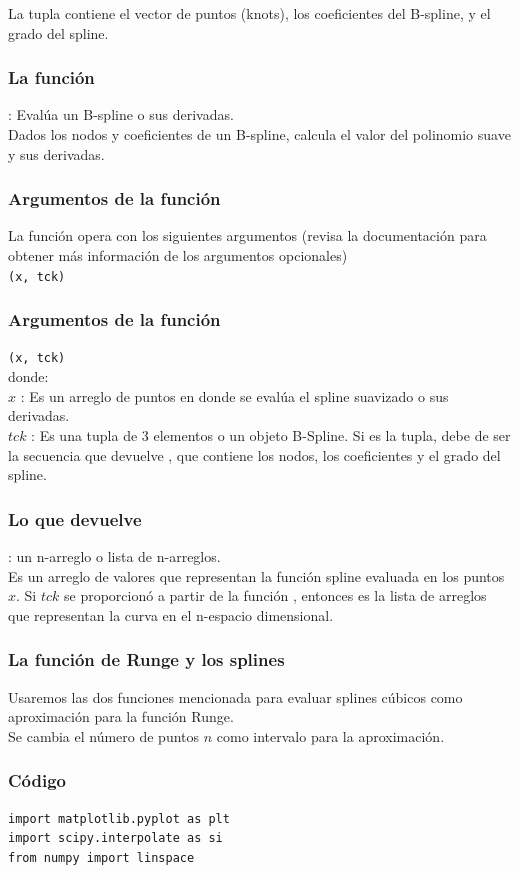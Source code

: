 {\begin{frame}
\bigskip
La tupla  contiene el vector de puntos (knots), los coeficientes del B-spline, y el grado del spline.
\end{frame}
\begin{frame}
\frametitle{La función }
: Evalúa un B-spline o sus derivadas.
\\
\bigskip
Dados los nodos y coeficientes de un B-spline, calcula el valor del polinomio suave y sus derivadas.
\end{frame}
\begin{frame}
\frametitle{Argumentos de la función}
La función opera con los siguientes argumentos (revisa la documentación para obtener más información de los argumentos opcionales)
\\
\bigskip
{} \texttt{(x, tck)}
\end{frame}
\begin{frame}
\frametitle{Argumentos de la función}
 \texttt{(x, tck)}
\\
\bigskip
donde:
\\
\medskip
$x$ : Es un arreglo de puntos en donde se evalúa el spline suavizado o sus derivadas.
\\
\medskip
$tck$ : Es una tupla de 3 elementos o un objeto B-Spline. Si es la tupla, debe de ser la secuencia que devuelve , que contiene los nodos, los coeficientes y el grado del spline.
\end{frame}
\begin{frame}
\frametitle{Lo que devuelve }
 : un n-arreglo o lista de n-arreglos.
\\
\bigskip
Es un arreglo de valores que representan la función spline evaluada en los puntos $x$. Si $tck$ se proporcionó a partir de la función , entonces es la lista de arreglos que representan la curva en el n-espacio dimensional.
\end{frame}
\begin{frame}
\frametitle{La función de Runge y los splines}
Usaremos las dos funciones mencionada para evaluar splines cúbicos como aproximación para la función Runge.
\\
\bigskip
Se cambia el número de puntos $n$ como intervalo para la aproximación.
\end{frame}
\begin{frame}
\frametitle{Código}
\begin{lstlisting}[caption=Código completo, style= FormattedNumber, basicstyle=\linespread{1.1}\ttfamily=\small, columns=fullflexible]
import matplotlib.pyplot as plt
import scipy.interpolate as si
from numpy import linspace


\end{lstlisting}
\end{frame}}
